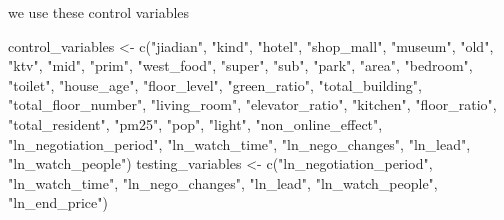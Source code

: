 \documentclass[
]{article}
\newenvironment{Shaded}{\begin{snugshade}}{\end{snugshade}}
\newcommand{\DecValTok}[1]{\textcolor[rgb]{0.00,0.00,0.81}{#1}}
\newcommand{\FunctionTok}[1]{\textcolor[rgb]{0.00,0.00,0.00}{#1}}
\newcommand{\NormalTok}[1]{#1}
\newcommand{\OtherTok}[1]{\textcolor[rgb]{0.56,0.35,0.01}{#1}}
\newcommand{\SpecialCharTok}[1]{\textcolor[rgb]{0.00,0.00,0.00}{#1}}
\newcommand{\StringTok}[1]{\textcolor[rgb]{0.31,0.60,0.02}{#1}}
\begin{document}
\begin{Shaded}
\end{Shaded}

we use these control variables

\begin{Shaded}
\begin{Highlighting}[]
\NormalTok{control\_variables }\OtherTok{\textless{}{-}} \FunctionTok{c}\NormalTok{(}\StringTok{"jiadian"}\NormalTok{, }\StringTok{"kind"}\NormalTok{, }\StringTok{"hotel"}\NormalTok{, }\StringTok{"shop\_mall"}\NormalTok{, }\StringTok{"museum"}\NormalTok{, }\StringTok{"old"}\NormalTok{,}
    \StringTok{"ktv"}\NormalTok{, }\StringTok{"mid"}\NormalTok{, }\StringTok{"prim"}\NormalTok{, }\StringTok{"west\_food"}\NormalTok{, }\StringTok{"super"}\NormalTok{, }\StringTok{"sub"}\NormalTok{, }\StringTok{"park"}\NormalTok{, }\StringTok{"area"}\NormalTok{, }\StringTok{"bedroom"}\NormalTok{,}
    \StringTok{"toilet"}\NormalTok{, }\StringTok{"house\_age"}\NormalTok{, }\StringTok{"floor\_level"}\NormalTok{, }\StringTok{"green\_ratio"}\NormalTok{, }\StringTok{"total\_building"}\NormalTok{, }\StringTok{"total\_floor\_number"}\NormalTok{,}
    \StringTok{"living\_room"}\NormalTok{, }\StringTok{"elevator\_ratio"}\NormalTok{, }\StringTok{"kitchen"}\NormalTok{, }\StringTok{"floor\_ratio"}\NormalTok{, }\StringTok{"total\_resident"}\NormalTok{,}
    \StringTok{"pm25"}\NormalTok{, }\StringTok{"pop"}\NormalTok{, }\StringTok{"light"}\NormalTok{, }\StringTok{"non\_online\_effect"}\NormalTok{, }\StringTok{"ln\_negotiation\_period"}\NormalTok{, }\StringTok{"ln\_watch\_time"}\NormalTok{,}
    \StringTok{"ln\_nego\_changes"}\NormalTok{, }\StringTok{"ln\_lead"}\NormalTok{, }\StringTok{"ln\_watch\_people"}\NormalTok{)}
\NormalTok{testing\_variables }\OtherTok{\textless{}{-}} \FunctionTok{c}\NormalTok{(}\StringTok{"ln\_negotiation\_period"}\NormalTok{, }\StringTok{"ln\_watch\_time"}\NormalTok{, }\StringTok{"ln\_nego\_changes"}\NormalTok{,}
    \StringTok{"ln\_lead"}\NormalTok{, }\StringTok{"ln\_watch\_people"}\NormalTok{, }\StringTok{"ln\_end\_price"}\NormalTok{)}
\end{Highlighting}
\end{Shaded}
\end{document}
